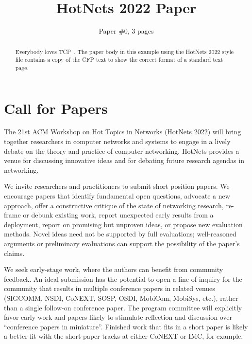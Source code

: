 \documentclass{hotnets22}
\begin{document}


\title{HotNets 2022 Paper}

\author{Paper \#0, 3 pages}

\maketitle

\begin{abstract}

Everybody loves TCP~\cite{vanjacobson}. The paper body in this example
using the HotNets 2022 style file contains a copy
of the CFP text to show the correct format of a standard text page.

\end{abstract}

\section{Call for Papers}

The 21st ACM Workshop on Hot Topics in Networks (HotNets 2022) will bring together researchers in computer networks and systems to engage in a lively debate on the theory and practice of computer networking. HotNets provides a venue for discussing innovative ideas and for debating future research agendas in networking.

We invite researchers and practitioners to submit short position papers. We encourage papers that identify fundamental open questions, advocate a new approach, offer a constructive critique of the state of networking research, re-frame or debunk existing work, report unexpected early results from a deployment, report on promising but unproven ideas, or propose new evaluation methods. Novel ideas need not be supported by full evaluations; well-reasoned arguments or preliminary evaluations can support the possibility of the paper's claims.

We seek early-stage work, where the authors can benefit from community feedback. An ideal submission has the potential to open a line of inquiry for the community that results in multiple conference papers in related venues (SIGCOMM, NSDI, CoNEXT, SOSP, OSDI, MobiCom, MobiSys, etc.), rather than a single follow-on conference paper. The program committee will explicitly favor early work and papers likely to stimulate reflection and discussion over ``conference papers in miniature''. Finished work that fits in a short paper is likely a better fit with the short-paper tracks at either CoNEXT or IMC, for example.
\end{document}
